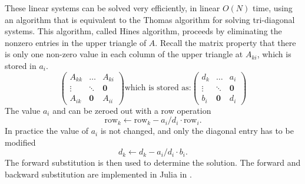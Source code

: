 These linear systems can be solved very efficiently, in linear $O(N)$ time, using an algorithm that is equivalent to the Thomas algorithm for solving tri-diagonal systems. This algorithm, called Hines algorithm, proceeds by eliminating the nonzero entries in the upper triangle of $A$. Recall the matrix property that there is only one non-zero value in each column of the upper triangle at $A_{ki}$, which is stored in $a_i$.
\begin{equation}
\left(
        \begin{array}{ccc}
            A_{kk} & \dots      & A_{ki} \\
        \vdots     & \ddots     & \mathbf{0} \\
            A_{ik} & \mathbf{0} & A_{ii}
        \end{array}
\right)
\text{which is stored as:}
\left(
        \begin{array}{ccc}
            d_k & \dots      & a_i \\
        \vdots  & \ddots     & \mathbf{0} \\
            b_i & \mathbf{0} & d_i
        \end{array}
\right)
\end{equation}
The value $a_i$ and can be zeroed out with a row operation
\begin{equation*}
    \text{row}_k \leftarrow \text{row}_k - a_i/d_i\cdot\text{row}_i.
\end{equation*}
In practice the value of $a_i$ is not changed, and only the diagonal entry has to be modified
\begin{equation*}
d_k \leftarrow d_k - a_i/d_i\cdot b_i.
\end{equation*}
The forward substitution is then used to determine the solution. The forward and backward substitution are implemented in Julia in .


